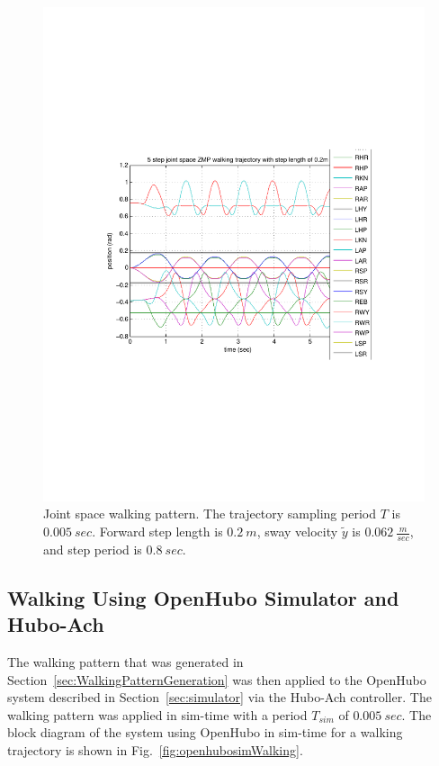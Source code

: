 \begin{figure}[t]
  \centering
\includegraphics[width=0.8\columnwidth]{./pix/walk5step.pdf}
  \caption{Joint space walking pattern.  The trajectory sampling period $T$ is $0.005~sec$.  Forward step length is $0.2~m$, sway velocity $\widetilde{y}$ is $0.062~\frac{m}{sec}$, and step period is $0.8~sec$.}
  \label{fig:huboZMPjointSpace}
\end{figure}





\subsection{Walking Using OpenHubo Simulator and Hubo-Ach}\label{sec:OpenHuboWalking}

The walking pattern that was generated in Section~\ref{sec:WalkingPatternGeneration} was then applied to the OpenHubo system described in Section~\ref{sec:simulator} via the Hubo-Ach controller.
The walking pattern was applied in sim-time with a period $T_{sim}$ of $0.005~sec$.
The block diagram of the system using OpenHubo in sim-time for a walking trajectory is shown in Fig.~\ref{fig:openhubosimWalking}.

